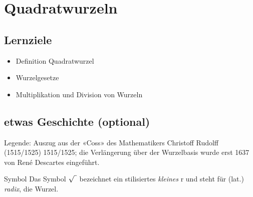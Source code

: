
\section{Quadratwurzeln}\index{$\sqrt{\mathstrut{}\,}$}

\subsection*{Lernziele}

\begin{itemize}
\item Definition Quadratwurzel
\item Wurzelgesetze
\item Multiplikation und Division von Wurzeln
\end{itemize}




\newpage
\subsection*{etwas Geschichte (optional)}

\noTRAINER{\vspace{50mm}}



Legende: 
Auszug aus der «Coss» des Mathematikers Christoff
Rudolff\cite{rudolff1515} (1515/1525)  1515/1525; die
Verlängerung über der Wurzelbasis wurde erst 1637 von René Descartes eingeführt.


\begin{bemerkung}{Symbol}{}
Das Symbol $\sqrt{\vphantom{b} \,\,}$
bezeichnet ein stilisiertes {\textit{kleines}} {\huge{r}} und steht für
  (lat.) \textit{radix}, die Wurzel.
\end{bemerkung}

